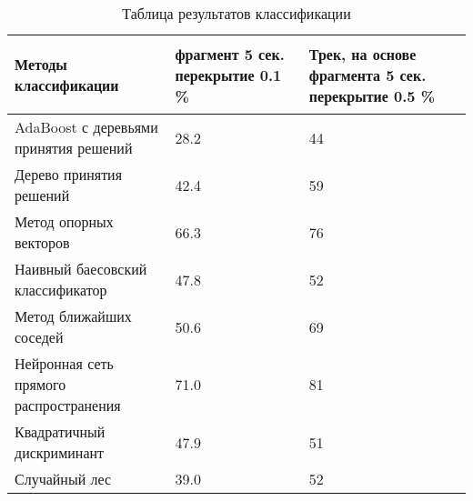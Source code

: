\begin{table}[h]
\caption{Таблица результатов классификации}
\label{table:result:result}
  \centering
  \begin{tabular}{| >{\raggedright}m{}
                  | >{\centering}m{}
                  | >{\centering\arraybackslash}m{}|}
    \hline
    {\begin{center}
    Методы классификации
    \end{center} } &  фрагмент 5 сек. перекрытие 0.1 \% &  Трек, на основе фрагмента 5 сек. перекрытие 0.5 \%  \\
    
    \hline
    
    AdaBoost с деревьями принятия решений & \num{28,2} & \num{44}  \\
    
    \hline

    Дерево принятия решений & \num{42,4} & \num{59}  \\

    \hline

    Метод опорных векторов & \num{66,3} & \num{76}   \\

    \hline

    Наивный баесовский классификатор & \num{47,8} & \num{52} \\

    \hline

    Метод ближайших соседей & \num{50,6} & \num{69} \\

    \hline

    Нейронная сеть прямого распространения & \num{71,0} & \num{81} \\

    \hline
    
    Квадратичный дискриминант & \num{47,9} & \num{51} \\

    \hline

    Случайный лес & \num{39,0} & \num{52}  \\

    \hline

  \end{tabular}
\end{table}





